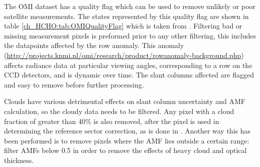     The OMI dataset has a quality flag which can be used to remove unlikely or poor satellite measurements.
    The states represented by this quality flag are shown in table \ref{ch_HCHO:tab:OMIQualityFlag} which is taken from \citet{Kurosu2014}.
    Filtering bad or missing measurement pixels is preformed prior to any other filtering, this includes the datapoints affected by the row anomaly.
    This anomaly (\url{http://projects.knmi.nl/omi/research/product/rowanomaly-background.php}) affects radiance data at particular viewing angles, corresponding to a row on the CCD detectors, and is dynamic over time.
    The slant columns affected are flagged and easy to remove before further processing.
    
    Clouds have various detrimental effects on slant column uncertainty and AMF calculation, so the cloudy data needs to be filtered.
    Any pixel with a cloud fraction of greater than 40\% is also removed, after the pixel is used in determining the reference sector correction, as is done in \citet{Abad2015, DeSmedt2015}.
    Another way this has been performed is to remove pixels where the AMF lies outside a certain range: \citet{Martin2002} filter AMFs below 0.5 in order to remove the effects of heavy cloud and optical thickness.
     

